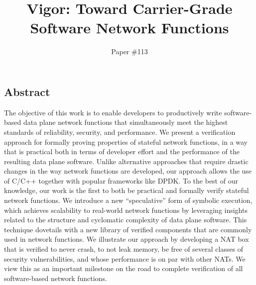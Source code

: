 \documentclass[letterpaper,twocolumn,10pt]{article}
\begin{document}
\date{}

\title{\Large \bf Vigor: Toward Carrier-Grade Software Network Functions}

\author{
    {\rm Paper \#113}\\
}

\maketitle

\thispagestyle{empty}


\subsection*{Abstract}
The objective of this work is to enable developers to productively write
software-based data plane network functions that simultaneously meet the highest
standards of reliability, security, and performance. We present a verification
approach for formally proving properties of stateful network functions, in a way
that is practical both in terms of developer effort and the performance of the
resulting data plane software. Unlike alternative approaches that require
drastic changes in the way network functions are developed, our approach allows
the use of C/C++ together with popular frameworks like DPDK. To the best of our
knowledge, our work is the first to both be practical and formally verify
stateful network functions. We introduce a new ``speculative'' form of symbolic
execution, which achieves scalability to real-world network functions by
leveraging insights related to the structure and cyclomatic complexity of data
plane software. This technique dovetails with a new library of verified
components that are commonly used in network functions. We illustrate our
approach by developing a NAT box that is verified to never crash, to not leak
memory, be free of several classes of security vulnerabilities, and whose
performance is on par with other NATs. %
We view this as an important milestone on the road to complete verification of all software-based network functions.
\end{document}
